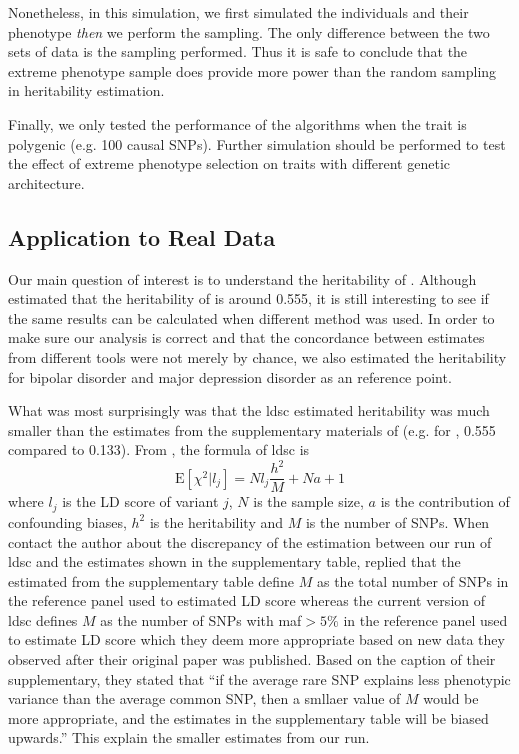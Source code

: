 	Nonetheless, in this simulation, we first simulated the individuals and their phenotype \emph{then} we perform the sampling.
	The only difference between the two sets of data is the sampling performed.
	Thus it is safe to conclude that the extreme phenotype sample does provide more power than the random sampling in heritability estimation.
		
	Finally, we only tested the performance of the algorithms when the trait is polygenic (e.g. 100 causal \glspl{SNP}).
	Further simulation should be performed to test the effect of extreme phenotype selection on traits with different genetic architecture. 
	
	\subsection{Application to Real Data}
	Our main question of interest is to understand the heritability of .
	Although \citet{Bulik-Sullivan2015c} estimated that the heritability of  is around 0.555, it is still interesting to see if the same results can be calculated when different method was used. 
	In order to make sure our analysis is correct and that the concordance between estimates from different tools were not merely by chance, we also estimated the heritability for bipolar disorder and major depression disorder as an reference point.
	
	What was most surprisingly was that the \gls{ldsc} estimated heritability was much smaller than the estimates from the supplementary materials of \citet{Bulik-Sullivan2015} (e.g. for , 0.555 compared to 0.133).
	From \citet{Bulik-Sullivan2015}, the formula of \gls{ldsc} is
	\begin{equation}
		\mathrm{E}[\chi^2|l_j] = Nl_j\frac{h^2}{M}+Na+1
	\end{equation}
	where $l_j$ is the \gls{LD} score of variant $j$, $N$ is the sample size, $a$ is the contribution of confounding biases, $h^2$ is the heritability and $M$ is the number of \glspl{SNP}.
	When contact the author about the discrepancy of the estimation between our run of \gls{ldsc} and the estimates shown in the supplementary table, \citet{Bulik-Sullivan2015c} replied that the estimated from the supplementary table define $M$ as the total number of \glspl{SNP} in the reference panel used to estimated \gls{LD} score whereas the current version of \gls{ldsc} defines $M$ as the number of \glspl{SNP} with \gls{maf}$>5\%$ in the reference panel used to estimate \gls{LD} score which they deem more appropriate based on new data they observed after their original paper was published.
	Based on the caption of their supplementary, they stated that ``if the average rare \gls{SNP} explains less phenotypic variance than the average common \gls{SNP}, then a smllaer value of $M$ would be more appropriate, and the estimates in the supplementary table will be biased upwards.''
	This explain the smaller estimates from our run. 
	
